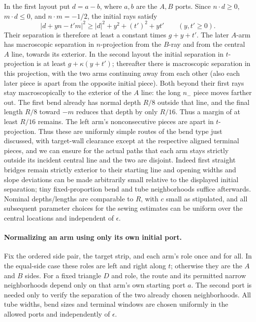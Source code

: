 In the first layout put \(d=a-b\), where \(a,b\) are the \(A,B\)
ports. Since \(n\cdot d\ge0\), \(m\cdot d\le0\), and
\(n\cdot m=-1/2\), the initial rays satisfy
\[
 |d+yn-t'm|^2\ge |d|^2+y^2+(t')^2+yt'\qquad(y,t'\ge0).
\]
Their separation is therefore at least a constant times \(g+y+t'\). The later \(A\)-arm has macroscopic separation in \(n\)-projection from the \(B\)-ray and from the central \(A\) line, towards its exterior. In the second layout the initial separation in \(t\)-projection is at least \(g+\kappa(y+t')\); thereafter there is macroscopic separation in this projection, with the two arms continuing away from each other (also each later piece is apart from the opposite initial piece). Both beyond their first rays stay macroscopically to the exterior of the \(A\) line: the long \(n_-\) piece moves farther out. The first bend already has
normal depth \(R/8\) outside that line, and the final length \(R/8\)
toward \(-m\) reduces that depth by only \(R/16\). Thus a margin of
at least \(R/16\) remains. The left arm's nonconsecutive pieces are apart in \(t\)-projection. Thus these are uniformly simple routes of the bend type just discussed, with target-wall clearance except at the respective aligned terminal pieces, and we can ensure for the actual paths that each arm stays strictly outside its incident central line and the two are disjoint. Indeed first straight bridges remain strictly exterior to their starting line and opening widths and slope deviations can be made arbitrarily small relative to the displayed initial separation; tiny fixed-proportion bend and tube neighborhoods suffice afterwards. Nominal depths/lengths are comparable to \(R\), with \(c\) small as stipulated, and all subsequent parameter choices for the sewing estimates can be uniform over the central locations and independent of \(\epsilon\).

\paragraph{Normalizing an arm using only its own initial port.}
Fix the ordered side pair, the target strip, and each arm's role once
and for all.  In the equal-side case these roles are left and right along
$t$; otherwise they are the $A$ and $B$ sides.  For a fixed triangle $D$
and role, the route and its permitted narrow neighborhoods depend only
on that arm's own starting port $a$.  The second port is needed only to
verify the separation of the two already chosen neighborhoods.  All tube
widths, bend sizes and terminal windows are chosen uniformly in the
allowed ports and independently of $\epsilon$.

